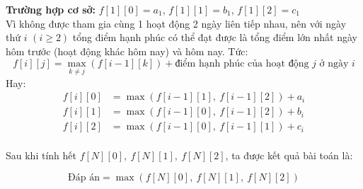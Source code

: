 \textbf{Trường hợp cơ sở:} $f[1][0] = a_1$, $f[1][1] = b_1$, $f[1][2] = c_1$\\

Vì không được tham gia cùng 1 hoạt động 2 ngày liên tiếp nhau, nên với ngày thứ $i$ $(i \geq 2)$ tổng điểm hạnh phúc có thể đạt được là tổng điểm lớn nhất ngày hôm trước (hoạt động khác hôm nay) và hôm nay. Tức: 
\[
f[i][j] = \max_{k \ne j} \left( f[i-1][k] \right) + \text{điểm hạnh phúc của hoạt động $j$ ở ngày $i$}
\]
Hay:
\[
\begin{aligned}
f[i][0] &= \max \left( f[i-1][1],\ f[i-1][2] \right) + a_i \\
f[i][1] &= \max \left( f[i-1][0],\ f[i-1][2] \right) + b_i \\
f[i][2] &= \max \left( f[i-1][0],\ f[i-1][1] \right) + c_i \\
\end{aligned}
\]

Sau khi tính hết \( f[N][0],\ f[N][1],\ f[N][2] \), ta được kết quả bài toán là:

\[
\text{Đáp án} = \max \left( f[N][0],\ f[N][1],\ f[N][2] \right)
\]

